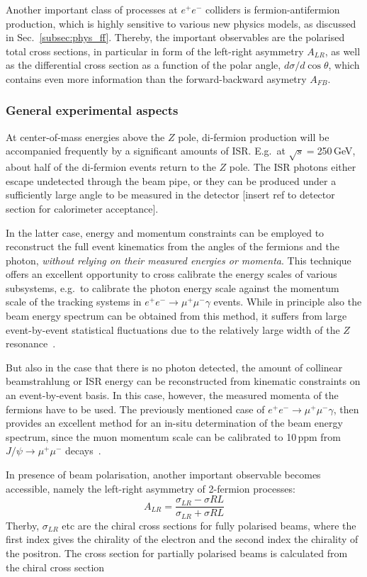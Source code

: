 Another important class of processes at $e^+e^-$ colliders is fermion-antifermion production, which is highly sensitive to various new physics models, as discussed in Sec.~\ref{subsec:phys_ff}. Thereby, the important observables are the polarised total cross sections, in particular in form of the left-right asymmetry $A_{LR}$, as well as the differential cross section as a function of the polar angle, $d\sigma/d \cos{\theta}$, which contains even more information than the forward-backward asymetry $A_{FB}$.

\subsubsection{General experimental aspects}

At center-of-mass energies above the $Z$ pole, di-fermion production will be accompanied frequently by a significant amounts of ISR. E.g.\ at $\sqrt{s}=$250\,GeV, about half of the di-fermion events return to the $Z$ pole. The ISR photons either escape undetected through the beam pipe, or they can be produced under a sufficiently large angle to be measured in the detector {\color{red} [insert ref to detector section for calorimeter acceptance]}.

In the latter case, energy and momentum constraints can be employed to reconstruct the full event kinematics from the angles of the fermions and the photon, {\em without relying on their measured energies or momenta}. This technique offers an excellent opportunity to cross calibrate the energy scales of various subsystems, e.g.\ to calibrate the photon energy scale against the momentum scale of the tracking systems in $e^+e^- \to \mu^+\mu^-\gamma $ events. While in principle also the beam energy spectrum can be obtained from this method, it suffers from large event-by-event statistical fluctuations due to the relatively large width of the $Z$ resonance~\cite{Wilson:2016hne}.

But also in the case that there is no photon detected, the amount of collinear beamstrahlung or ISR energy can be reconstructed from kinematic constraints on an event-by-event basis. In this case, however, the measured momenta of the fermions have to be used. The previously mentioned case of $e^+e^- \to \mu^+\mu^-\gamma $, then provides an excellent method for an in-situ determination of the beam energy spectrum, since the muon momentum scale can be calibrated to 10\,ppm from $J/\psi \to \mu^+\mu^-$ decays~\cite{Wilson:2016hne}.

In presence of beam polarisation, another important observable becomes accessible, namely the left-right asymmetry of 2-fermion processes:
\begin{equation}
A_{LR} = \frac{\sigma_{LR}-\sigma{RL}}{\sigma_{LR}+\sigma{RL}}
\end{equation}
Therby, $\sigma_{LR}$ etc are the chiral cross sections for fully polarised beams, where the first index gives the chirality of the electron and the second index the chirality of the positron.
The cross section for partially polarised beams is calculated from the chiral cross section 

